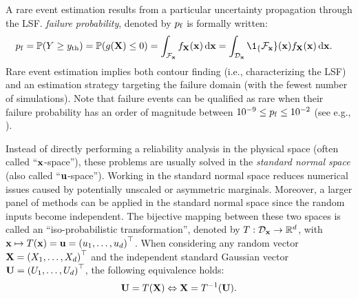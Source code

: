 A rare event estimation results from a particular uncertainty propagation through the LSF. 
\textit{failure probability}, denoted by $p_\mathrm{f}$ is formally written:%
\begin{equation}
    \begin{split}
        \pf = \P(Y \geq \yth) &= \P(g(\bX) \leq 0) = \int_{\iF_\bx} f_\bX(\bx) \, \dd\bx
        = \int_{\iD_\bx} \1_\{\iF_\bx\}(\bx) f_\bX(\bx) \, \dd\bx .
    \end{split}
    \label{eq:pf}
\end{equation}
Rare event estimation implies both contour finding (i.e., characterizing the LSF) and an estimation strategy targeting the failure domain (with the fewest number of simulations). 
Note that failure events can be qualified as rare when their failure probability has an order of magnitude between $10^{-9} \leq p_\mathrm{f} \leq 10^{-2}$ (see e.g., \citealp{lemaire_2009}). 

Instead of directly performing a reliability analysis in the physical space (often called ``${\bf x}$-space''), these problems are usually solved in the \emph{standard normal space} (also called ``${\bf u}$-space''). 
Working in the standard normal space reduces numerical issues caused by potentially unscaled or asymmetric marginals. 
Moreover, a larger panel of methods can be applied in the standard normal space since the random inputs become independent.   
The bijective mapping between these two spaces is called an ``iso-probabilistic transformation'', 
denoted by $T: \mathcal{D}_{{\bf x}} \rightarrow \mathbb{R}^d$, with ${\bf x} \mapsto T({\bf x}) = {\bf u} = \left(u_1, \dots, u_d\right)^\top$. 
When considering any random vector ${\bf X} = \left(X_1, \dots, X_d\right)^\top$ and the independent standard Gaussian vector ${\bf U} = \left(U_1, \dots, U_d\right)^\top$, the following equivalence holds:
\begin{equation}
    {\bf U} = T({\bf X}) \Leftrightarrow {\bf X} = T^{-1}({\bf U}).
\end{equation} 

